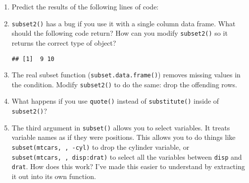 \begin{enumerate}
\def\labelenumi{\arabic{enumi}.}
\item
  Predict the results of the following lines of code:

\begin{Shaded}
\begin{Highlighting}[]
\NormalTok{(}\NormalTok{(}\NormalTok{(}\NormalTok{(}\NormalTok{(}\NormalTok{(} \OperatorTok{+}\StringTok{ }\NormalTok{))))))}
\NormalTok{(}\NormalTok{(}\NormalTok{(}\NormalTok{(}\NormalTok{(}\NormalTok{(}\NormalTok{(} \OperatorTok{+}\StringTok{ }\NormalTok{)))))))}
\NormalTok{(}\NormalTok{(}\NormalTok{(}\NormalTok{(}\NormalTok{(}\NormalTok{(}\NormalTok{(} \OperatorTok{+}\StringTok{ }\NormalTok{)))))))}
\end{Highlighting}
\end{Shaded}
\item
  \texttt{subset2()} has a bug if you use it with a single column data
  frame. What should the following code return? How can you modify
  \texttt{subset2()} so it returns the correct type of object?

\begin{Shaded}
\begin{Highlighting}[]
\StringTok{ }\NormalTok{(} \OperatorTok{:}\NormalTok{)}
\OperatorTok{>}\StringTok{ }\NormalTok{)}
\end{Highlighting}
\end{Shaded}

\begin{verbatim}
## [1]  9 10
\end{verbatim}
\item
  The real subset function (\texttt{subset.data.frame()}) removes
  missing values in the condition. Modify \texttt{subset2()} to do the
  same: drop the offending rows.
\item
  What happens if you use \texttt{quote()} instead of
  \texttt{substitute()} inside of \texttt{subset2()}?
\item
  The third argument in \texttt{subset()} allows you to select
  variables. It treats variable names as if they were positions. This
  allows you to do things like \texttt{subset(mtcars,\ ,\ -cyl)} to drop
  the cylinder variable, or \texttt{subset(mtcars,\ ,\ disp:drat)} to
  select all the variables between \texttt{disp} and \texttt{drat}. How
  does this work? I've made this easier to understand by extracting it
  out into its own function.


\end{enumerate}

